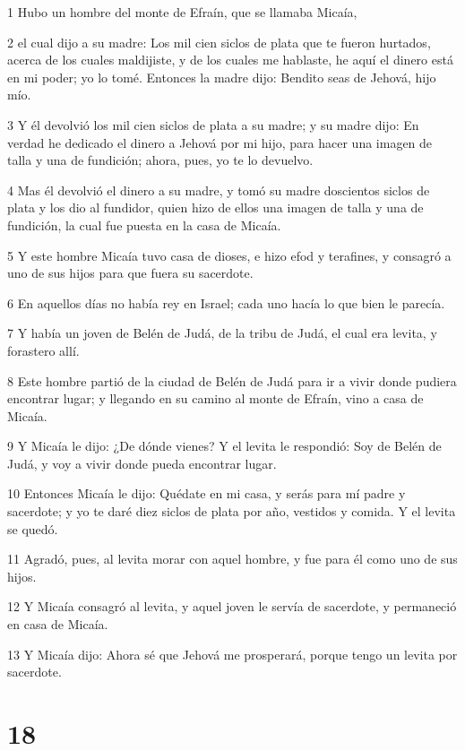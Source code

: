 \par 1 Hubo un hombre del monte de Efraín, que se llamaba Micaía,
\par 2 el cual dijo a su madre: Los mil cien siclos de plata   que te fueron hurtados, acerca de los cuales maldijiste, y de los cuales me hablaste, he aquí el dinero está en mi poder; yo lo tomé. Entonces la madre dijo: Bendito seas de Jehová, hijo mío.
\par 3 Y él devolvió los mil cien siclos de plata   a su madre; y su madre dijo: En verdad he dedicado el dinero a Jehová por mi hijo, para hacer una imagen de talla y una de fundición; ahora, pues, yo te lo devuelvo.
\par 4 Mas él devolvió el dinero a su madre, y tomó su madre doscientos siclos de plata   y los dio al fundidor, quien hizo de ellos una imagen de talla y una de fundición, la cual fue puesta en la casa de Micaía.
\par 5 Y este hombre Micaía tuvo casa de dioses, e hizo efod y terafines, y consagró a uno de sus hijos para que fuera su sacerdote.
\par 6 En aquellos días no había rey en Israel; cada uno hacía lo que bien le parecía. 
\par 7 Y había un joven de Belén de Judá, de la tribu de Judá, el cual era levita, y forastero allí.
\par 8 Este hombre partió de la ciudad de Belén de Judá para ir a vivir donde pudiera encontrar lugar; y llegando en su camino al monte de Efraín, vino a casa de Micaía.
\par 9 Y Micaía le dijo: ¿De dónde vienes? Y el levita le respondió: Soy de Belén de Judá, y voy a vivir donde pueda encontrar lugar.
\par 10 Entonces Micaía le dijo: Quédate en mi casa, y serás para mí padre y sacerdote; y yo te daré diez siclos de plata   por año, vestidos y comida. Y el levita se quedó. 
\par 11 Agradó, pues, al levita morar con aquel hombre, y fue para él como uno de sus hijos.
\par 12 Y Micaía consagró al levita, y aquel joven le servía de sacerdote, y permaneció en casa de Micaía.
\par 13 Y Micaía dijo: Ahora sé que Jehová me prosperará, porque tengo un levita por sacerdote.

\chapter{18}

